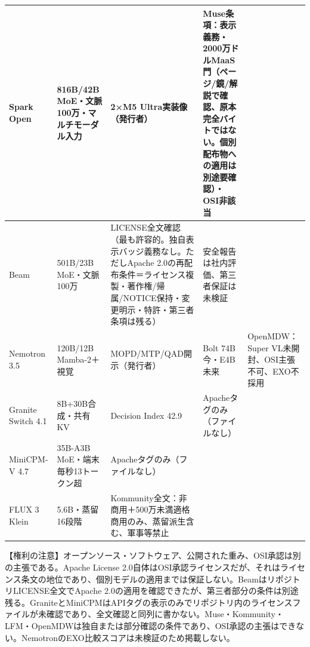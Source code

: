 \documentclass[lualatex,a4paper,10pt]{jlreq}
\begin{document}
\begin{strip} %
\centering\footnotesize
{}
\begin{tabularx}{0.96\linewidth}{@{}lXXXX@{}}
\toprule
Spark Open & 816B/42B MoE・文脈100万・マルチモーダル入力 & 2×M5 Ultra実装像（発行者） & Muse条項：表示義務・2000万ドルMaaS門（ページ/鏡/解説で確認、原本完全バイトではない。個別配布物への適用は別途要確認）・OSI非該当 \cite{B14,B70,B15,B13} \\
\midrule
Beam & 501B/23B MoE・文脈100万 & LICENSE全文確認（最も許容的。独自表示バッジ義務なし。ただしApache 2.0の再配布条件＝ライセンス複製・著作権/帰属/NOTICE保持・変更明示・特許・第三者条項は残る） & 安全報告は社内評価、第三者保証は未検証 \cite{B17,B19,B18,B16} \\
\midrule
Nemotron 3.5 & 120B/12B Mamba-2＋視覚 & MOPD/MTP/QAD開示（発行者） & Bolt 74B今・E4B未来 & OpenMDW：Super VL未開封、OSI主張不可、EXO不採用 \cite{B21,B72,B22,B20} \\
\midrule
Granite Switch 4.1 & 8B+30B合成・共有KV & Decision Index 42.9 & Apacheタグのみ（ファイルなし） \cite{B24,B73,B23,B25} \\
\midrule
MiniCPM-V 4.7 & 35B-A3B MoE・端末毎秒13トークン超 & Apacheタグのみ（ファイルなし） \cite{B27,B74,B26} \\
\midrule
FLUX 3 Klein & 5.6B・蒸留16段階 & Kommunity全文：非商用＋500万未満適格商用のみ、蒸留派生含む、軍事等禁止 \cite{B29,B28,B30} \\
\bottomrule
\end{tabularx}
\end{strip} %

\begin{tcolorbox}[colback=SurveySoft,colframe=SurveyRule,arc=1mm,boxrule=0.4pt,left=2mm,right=2mm]
【権利の注意】オープンソース・ソフトウェア、公開された重み、OSI承認は別の主張である。Apache License 2.0自体はOSI承認ライセンスだが、それはライセンス条文の地位であり、個別モデルの適用までは保証しない。BeamはリポジトリLICENSE全文でApache 2.0の適用を確認できたが、第三者部分の条件は別途残る。GraniteとMiniCPMはAPIタグの表示のみでリポジトリ内のライセンスファイルが未確認であり、全文確認と同列に書かない。Muse・Kommunity・LFM・OpenMDWは独自または部分確認の条件であり、OSI承認の主張はできない。NemotronのEXO比較スコアは未検証のため掲載しない。
\end{tcolorbox}
\cite{B14,B70,B15,B13,B71,B17,B19,B18,B16,B21,B72,B22,B20,B24,B73,B23,B25,B27,B74,B26,B29,B28,B30}
\end{document}

